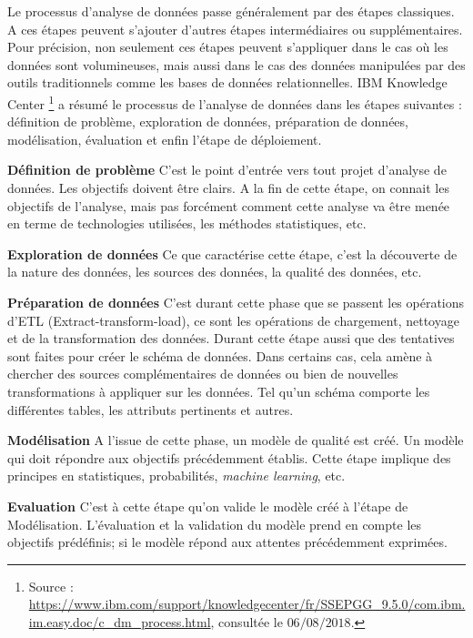 Le processus d'analyse de données passe généralement par des étapes classiques. A ces étapes peuvent s'ajouter d'autres étapes intermédiaires ou supplémentaires. 
Pour précision, non seulement  ces étapes peuvent s'appliquer dans le cas  où les données sont volumineuses,  mais aussi dans le cas des données manipulées par des outils traditionnels comme les bases de données relationnelles. IBM Knowledge Center \footnote{Source : \url{https://www.ibm.com/support/knowledgecenter/fr/SSEPGG_9.5.0/com.ibm.im.easy.doc/c_dm_process.html}, consultée le $06/08/2018$.} a résumé le processus de l'analyse de données dans les étapes suivantes :
définition de problème, exploration de données, préparation de données, modélisation, évaluation et enfin l'étape de déploiement.


\textbf{Définition de problème} C'est le point d'entrée vers tout projet d'analyse de données. Les objectifs doivent être clairs. A la fin de cette étape, on connait les objectifs de l'analyse, mais pas forcément comment cette analyse va être menée en terme de technologies utilisées,  les méthodes statistiques, etc. \par

\textbf{Exploration de données } Ce que caractérise cette étape, c'est la découverte de la nature  des données, les sources des données, la qualité des données, etc. \par

\textbf{Préparation de données} \label{par:step-preparedata} C'est durant cette phase que se passent les opérations d'ETL (Extract-transform-load), ce sont les opérations de chargement,  nettoyage et de la transformation des données. Durant cette étape aussi que  des tentatives sont faites pour créer le schéma de données.  Dans certains cas, cela amène  à chercher des sources complémentaires de données ou bien de nouvelles transformations à appliquer sur les données. Tel qu'un  schéma comporte les différentes tables, les attributs pertinents et autres. \par

\textbf{Modélisation} A l'issue de cette phase, un modèle de qualité est créé. Un modèle qui doit  répondre aux objectifs précédemment établis. Cette étape implique des principes en statistiques, probabilités, \textit{machine learning}, etc. \par

\textbf{Evaluation} C'est à cette étape qu'on valide le modèle créé à l'étape de  Modélisation. L'évaluation et la validation du modèle prend en compte les objectifs prédéfinis; si le modèle répond aux attentes précédemment exprimées. \par

